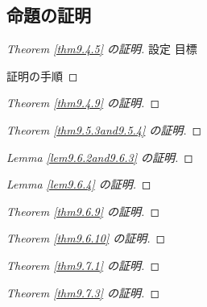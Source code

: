 \subsection{命題の証明}
\begin{proof}[Theorem \ref{thm9.4.5} の証明]
設定
目標

証明の手順

\end{proof}
\begin{proof}[Theorem \ref{thm9.4.9} の証明]
\end{proof}
\begin{proof}[Theorem \ref{thm9.5.3and9.5.4} の証明]
\end{proof}
\begin{proof}[Lemma \ref{lem9.6.2and9.6.3} の証明]
\end{proof}\begin{proof}[Lemma \ref{lem9.6.4} の証明]
\end{proof}
\begin{proof}[Theorem \ref{thm9.6.9} の証明]
\end{proof}
\begin{proof}[Theorem \ref{thm9.6.10} の証明]
\end{proof}
\begin{proof}[Theorem \ref{thm9.7.1} の証明]
\end{proof}
\begin{proof}[Theorem \ref{thm9.7.3} の証明]
\end{proof}
